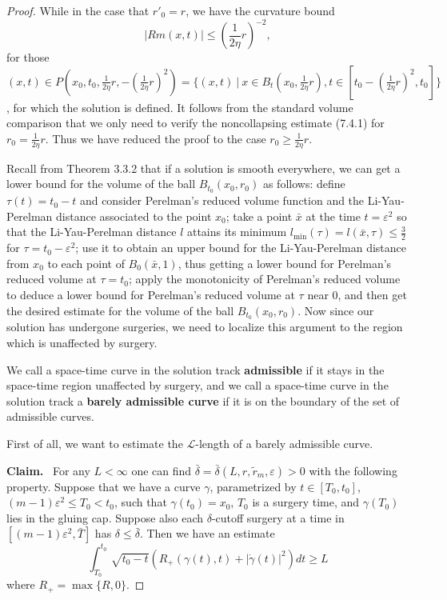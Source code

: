 \begin{proof}
While in the case that $r'_0 = r$, we have the curvature bound
$$
|Rm(x,t)|\leq \left(\frac{1}{2\eta}r\right)^{-2},
$$
for those $(x,t) \in
P(x_0,t_0,\frac{1}{2\eta}r,-(\frac{1}{2\eta}r)^{2}) = \{(x,t)\ |\
x\in
B_t(x_0,\frac{1}{2\eta}r),t\in[t_0-(\frac{1}{2\eta}r)^2,t_0]\}$,
for which the solution is defined. It follows from the standard
volume comparison that we only need to verify the noncollapsing
estimate (7.4.1) for $r_0 = \frac{1}{2\eta}r$. Thus we have
reduced the proof to the case $r_0\geq \frac{1}{2\eta}r$.

Recall from Theorem 3.3.2 that if a solution is smooth everywhere,
we can get a lower bound for the volume of the ball
$B_{t_0}(x_0,r_0)$ as follows: define $\tau(t)=t_0-t$ and consider
Perelman's reduced volume function and the Li-Yau-Perelman
distance associated to the point $x_0$; take a point $\bar{x}$ at
the time $ t=\varepsilon^2$ so that the Li-Yau-Perelman distance
$l$ attains its minimum
$l_{\min}(\tau)=l(\bar{x},\tau)\leq\frac{3}{2}$ for $\tau
=t_0-\varepsilon^2$; use it to obtain an upper bound for the
Li-Yau-Perelman distance from $x_0$ to each point of
$B_0(\bar{x},1)$, thus getting a lower bound for Perelman's
reduced volume at $\tau=t_0$; apply the monotonicity of Perelman's
reduced volume to deduce a lower bound for Perelman's reduced
volume at $\tau$ near $0$, and then get the desired estimate for
the volume of the ball $B_{t_0}(x_0,r_0)$. Now since our solution
has undergone surgeries, we need to localize this argument to the
region which is unaffected by surgery.

We call a space-time curve in the solution track
\textbf{admissible} if it stays in the
space-time region unaffected by surgery, and we call a space-time
curve in the solution track a \textbf{barely admissible
curve} if it is on the boundary of
the set of admissible curves.

 First of all, we want to estimate the $\mathcal{L}$-length of a
barely admissible curve.

\medskip
{\bf Claim.} \ For any $L<\infty$ one can find
$\bar{\delta}=\bar{\delta}(L,r,\widetilde{r}_m,\varepsilon)>0$
with the following property. Suppose that we have a curve
$\gamma$, parametrized by $t\in[T_0,t_0]$, $(m-1)\varepsilon^2\leq
T_0<t_0$, such that $\gamma(t_0)=x_0$, $T_0$ is a surgery time,
and $\gamma(T_0)$ lies in the gluing cap. Suppose also each
$\delta$-cutoff surgery at a time in
$[(m-1)\varepsilon^2,\bar{T}]$ has $\delta \leq \bar{\delta}$.
Then we have an estimate \begin{equation}
\int^{t_0}_{T_0}\sqrt{t_0-t}(R_+(\gamma(t),t)
+|\dot{\gamma}(t)|^2)dt\geq L  %
\end{equation} where $R_+=\max\{R,0\}$.


\end{proof}
